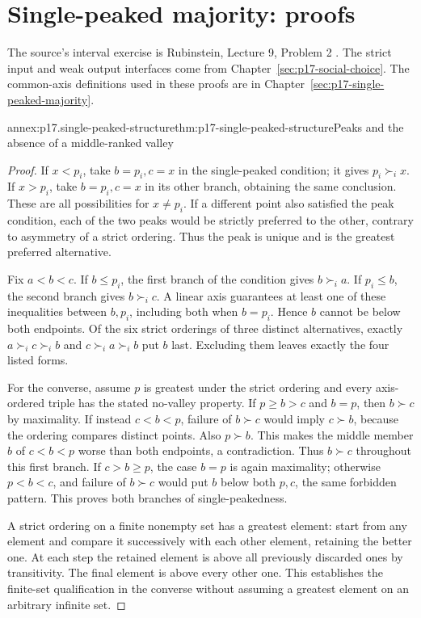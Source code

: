 \section{Single-peaked majority: proofs}
\label{sec:annex-p17-single-peaked-majority}

The source's interval exercise is Rubinstein, Lecture 9, Problem 2
\cite[p.~128]{Rubinstein2015LectureNotes}. The strict input and weak output
interfaces come from Chapter~\ref{sec:p17-social-choice}. The common-axis
definitions used in these proofs are in
Chapter~\ref{sec:p17-single-peaked-majority}.

\begin{annexitem}{annex:p17.single-peaked-structure}{thm:p17-single-peaked-structure}{Peaks and the absence of a middle-ranked valley}
\begin{proof}
If \(x<p_i\), take \(b=p_i,c=x\) in the single-peaked condition;
it gives \(p_i\succ_i x\). If \(x>p_i\), take \(b=p_i,c=x\)
in its other branch, obtaining the same conclusion. These are all
possibilities for \(x\ne p_i\). If a different point also satisfied
the peak condition, each of the two peaks would be strictly preferred
to the other, contrary to asymmetry of a strict ordering. Thus the peak
is unique and is the greatest preferred alternative.

Fix \(a<b<c\). If \(b\leq p_i\), the first branch of the
condition gives \(b\succ_i a\). If \(p_i\leq b\), the second
branch gives \(b\succ_i c\). A linear axis guarantees at least
one of these inequalities between \(b,p_i\), including both when
\(b=p_i\). Hence \(b\) cannot be below both endpoints. Of the six
strict orderings of three distinct alternatives, exactly
\(a\succ_i c\succ_i b\) and \(c\succ_i a\succ_i b\) put \(b\)
last. Excluding them leaves exactly the four listed forms.

For the converse, assume \(p\) is greatest under the strict ordering
and every axis-ordered triple has the stated no-valley property.
If \(p\geq b>c\) and \(b=p\), then \(b\succ c\) by maximality.
If instead \(c<b<p\), failure of \(b\succ c\) would imply
\(c\succ b\), because the ordering compares distinct points.
Also \(p\succ b\). This makes the middle member \(b\) of
\(c<b<p\) worse than both endpoints, a contradiction.
Thus \(b\succ c\) throughout this first branch.
If \(c>b\geq p\), the case \(b=p\) is again maximality;
otherwise \(p<b<c\), and failure of \(b\succ c\) would put
\(b\) below both \(p,c\), the same forbidden pattern. This proves
both branches of single-peakedness.

A strict ordering on a finite nonempty set has a greatest element:
start from any element and compare it successively with each other
element, retaining the better one. At each step the retained element
is above all previously discarded ones by transitivity. The final
element is above every other one. This establishes the finite-set
qualification in the converse without assuming a greatest element on
an arbitrary infinite set.
\end{proof}
\end{annexitem}

